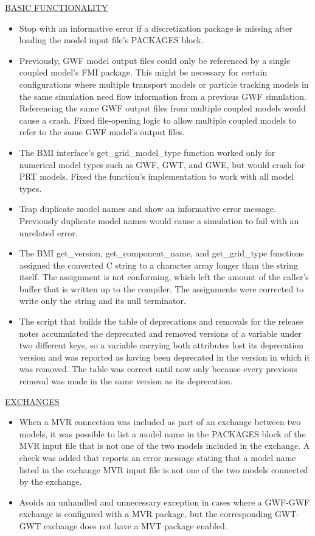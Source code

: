 \underline{BASIC FUNCTIONALITY}
\begin{itemize}
\item Stop with an informative error if a discretization package is missing after loading the model input file's PACKAGES block.
\item Previously, GWF model output files could only be referenced by a single coupled model's FMI package. This might be necessary for certain configurations where multiple transport models or particle tracking models in the same simulation need flow information from a previous GWF simulation. Referencing the same GWF output files from multiple coupled models would cause a crash. Fixed file-opening logic to allow multiple coupled models to refer to the same GWF model's output files.
\item The BMI interface's get\_grid\_model\_type function worked only for numerical model types such as GWF, GWT, and GWE, but would crash for PRT models. Fixed the function's implementation to work with all model types.
\item Trap duplicate model names and show an informative error message. Previously duplicate model names would cause a simulation to fail with an unrelated error.
\item The BMI get\_version, get\_component\_name, and get\_grid\_type functions assigned the converted C string to a character array longer than the string itself. The assignment is not conforming, which left the amount of the caller's buffer that is written up to the compiler. The assignments were corrected to write only the string and its null terminator.
\item The script that builds the table of deprecations and removals for the release notes accumulated the deprecated and removed versions of a variable under two different keys, so a variable carrying both attributes lost its deprecation version and was reported as having been deprecated in the version in which it was removed. The table was correct until now only because every previous removal was made in the same version as its deprecation.
\end{itemize}

\underline{EXCHANGES}
\begin{itemize}
\item When a MVR connection was included as part of an exchange between two models, it was possible to list a model name in the PACKAGES block of the MVR input file that is not one of the two models included in the exchange.  A check was added that reports an error message stating that a model name listed in the exchange MVR input file is not one of the two models connected by the exchange.
\item Avoids an unhandled and unnecessary exception in cases where a GWF-GWF exchange is configured with a MVR package, but the corresponding GWT-GWT exchange does not have a MVT package enabled.
\end{itemize}

